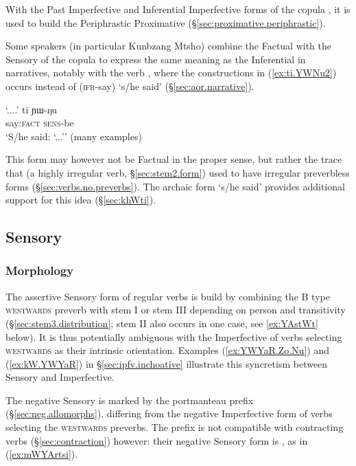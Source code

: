 With the Past Imperfective  and Inferential Imperfective  forms of the copula , it is used to build the Periphrastic Proximative (§\ref{sec:proximative.periphrastic}).

Some speakers (in particular Kunbzang Mtsho) combine the Factual with the Sensory  of the copula to express the same meaning as the Inferential in narratives, notably with the verb , where the constructions in (\ref{ex:ti.YWNu2}) occurs instead of  (\textsc{ifr}-say) `s/he said' (§\ref{sec:aor.narrative}).

\begin{exe}
\ex \label{ex:ti.YWNu2}
\gll `....' ti ɲɯ-ŋu \\
{ } say:\textsc{fact} \textsc{sens}-be \\
\glt `S/he said: `...'' (many examples)
\end{exe}

This form may however not be Factual in the proper sense, but rather the trace that  (a highly irregular verb, §\ref{sec:stem2.form}) used to have irregular preverbless forms (§\ref{sec:verbs.no.preverbs}). The archaic form  `s/he said' provides additional support for this idea (§\ref{sec:khWti}).


\subsection{Sensory} \label{sec:sensory}

\subsubsection{Morphology} \label{sec:sensory.morphology}
The assertive Sensory form of regular verbs is build by combining the B type \textsc{westwards}  preverb with stem I or stem III depending on person and transitivity (§\ref{sec:stem3.distribution}; stem II also occurs in one case, see \ref{ex:YAstWt} below). It is thus potentially ambiguous with the Imperfective of verbs selecting \textsc{westwards} as their intrinsic orientation. Examples (\ref{ex:YWYaR.Zo.Nu}) and (\ref{ex:kW.YWYaR}) in §\ref{sec:ipfv.inchoative} illustrate this syncretism between Sensory and Imperfective.

The negative Sensory is marked by the portmanteau prefix  (§\ref{sec:neg.allomorphs}), differing from the negative Imperfective form  of verbs selecting the \textsc{westwards} preverbs. The  prefix is not compatible with contracting verbs (§\ref{sec:contraction}) however: their negative Sensory form is , as in (\ref{ex:mWYArtsi}).

